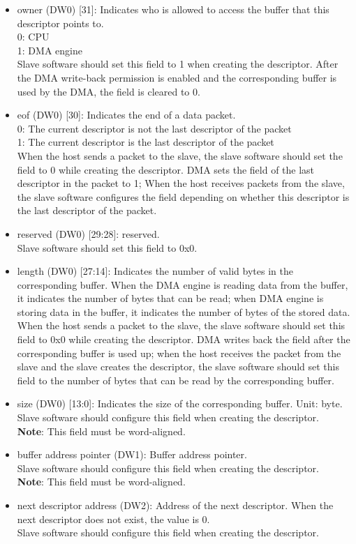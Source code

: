 \documentclass[main\_\_EN.tex]{subfiles}
\begin{document}
\begin{itemize}
     \item owner (DW0) [31]: Indicates who is allowed to access the buffer that this descriptor points to. \\
     0: CPU\\
     1: DMA engine\\
     Slave software should set this field to 1 when creating the descriptor. After the DMA write-back permission is enabled and the corresponding buffer is used by the DMA, the field is cleared to 0.
     \item eof (DW0) [30]: Indicates the end of a data packet. \\
     0: The current descriptor is not the last descriptor of the packet\\
     1: The current descriptor is the last descriptor of the packet\\
     When the host sends a packet to the slave, the slave software should set the field to 0 while creating the descriptor. DMA sets the field of the last descriptor in the packet to 1; When the host receives packets from the slave, the slave software configures the field depending on whether this descriptor is the last descriptor of the packet.
     \item reserved (DW0) [29:28]: reserved. \\
     Slave software should set this field to 0x0.
     \item length (DW0) [27:14]: Indicates the number of valid bytes in the corresponding buffer. When the DMA engine is reading data from the buffer, it indicates the number of bytes that can be read; when DMA engine is storing data in the buffer, it indicates the number of bytes of the stored data. \\
     When the host sends a packet to the slave, the slave software should set this field to 0x0 while creating the descriptor. DMA writes back the field after the corresponding buffer is used up; when the host receives the packet from the slave and the slave creates the descriptor, the slave software should set this field to the number of bytes that can be read by the corresponding buffer.
     \item size (DW0) [13:0]: Indicates the size of the corresponding buffer. Unit: byte. \\
     Slave software should configure this field when creating the descriptor. \\
        {\bfseries Note}: This field must be word-aligned.
     \item buffer address pointer (DW1): Buffer address pointer. \\
     Slave software should configure this field when creating the descriptor.\\
     {\bfseries Note}: This field must be word-aligned.
     \item next descriptor address (DW2): Address of the next descriptor. When the next descriptor does not exist, the value is 0. \\
     Slave software should configure this field when creating the descriptor.
\end{itemize}
\end{document}
